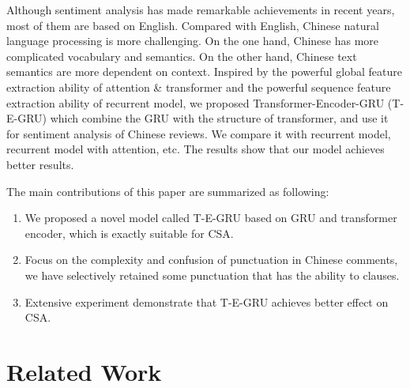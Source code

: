 Although sentiment analysis has made remarkable achievements in recent years, most of them are based on English. Compared with English, Chinese natural language processing is more challenging. On the one hand, Chinese has more complicated vocabulary and semantics. On the other hand, Chinese text semantics are more dependent on context. 
Inspired by the powerful global feature extraction ability of attention \& transformer and the powerful sequence feature extraction ability of recurrent model, we proposed Transformer-Encoder-GRU (T-E-GRU) which combine the GRU with the structure of transformer, and use it for sentiment analysis of Chinese reviews. We compare it with recurrent model, recurrent model with attention, etc. The results show that our model achieves better results.

The main contributions of this paper are summarized as following:
\begin{enumerate}
	\item We proposed a novel model called T-E-GRU based on GRU and transformer encoder, which is exactly suitable for CSA.
	\item Focus on the complexity and confusion of punctuation in Chinese comments, we have selectively retained some punctuation that has the ability to clauses.
	\item Extensive experiment demonstrate that T-E-GRU achieves better effect on CSA.
\end{enumerate}

\section{Related Work}

